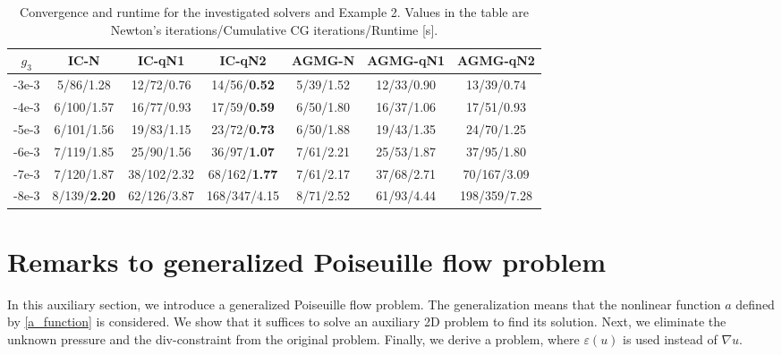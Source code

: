\documentclass[12pt]{article}
\numberwithin{equation}{section}
\begin{document}
\begin{table}[h!]
	\caption{Convergence and runtime for the investigated solvers and Example 2. Values in the table are Newton's iterations/Cumulative CG iterations/Runtime [s].}
	\begin{tabular}{|c||c|c|c||c|c|c|}
		\hline
		$g_3$ & IC-N & IC-qN1 & IC-qN2 & AGMG-N & AGMG-qN1 & AGMG-qN2 \\ \hline\hline
		-3e-3 & 5/86/1.28 & 12/72/0.76 & 14/56/\textbf{0.52} & 5/39/1.52 & 12/33/0.90 & 13/39/0.74\\ \hline
		-4e-3 & 6/100/1.57 & 16/77/0.93 & 17/59/\textbf{0.59} & 6/50/1.80 & 16/37/1.06 & 17/51/0.93\\ \hline
		-5e-3 & 6/101/1.56 & 19/83/1.15 & 23/72/\textbf{0.73} & 6/50/1.88 & 19/43/1.35 & 24/70/1.25\\ \hline
		-6e-3 & 7/119/1.85 & 25/90/1.56 & 36/97/\textbf{1.07} & 7/61/2.21 & 25/53/1.87 & 37/95/1.80\\ \hline
		-7e-3 & 7/120/1.87 & 38/102/2.32 & 68/162/\textbf{1.77} & 7/61/2.17 & 37/68/2.71 & 70/167/3.09\\ \hline
		-8e-3 & 8/139/\textbf{2.20} & 62/126/3.87 & 168/347/4.15 & 8/71/2.52 & 61/93/4.44 & 198/359/7.28\\ \hline
	\end{tabular}
	\label{table_ex2}
\end{table}

\section{Remarks to generalized Poiseuille flow problem}


In this auxiliary section, we introduce a generalized Poiseuille flow problem. The generalization means that the nonlinear function $a$ defined by \eqref{a_function} is considered. We show that it suffices to solve an auxiliary 2D problem to find its solution. Next, we eliminate the unknown pressure and the div-constraint from the original problem. Finally, we derive a problem, where $\varepsilon(u)$ is used instead of $\nabla u$.
\end{document}
